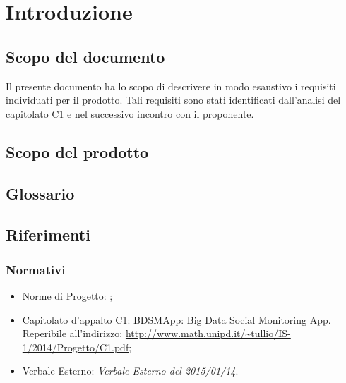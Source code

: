 %


\section{Introduzione}

\subsection{Scopo del documento}
Il presente documento ha lo scopo di descrivere in modo esaustivo i requisiti individuati per il prodotto. Tali requisiti sono stati identificati dall'analisi del capitolato C1 e nel successivo incontro con il proponente.

\subsection{Scopo del prodotto}
	\productScope

\subsection{Glossario}
	\glossarioDesc

\subsection{Riferimenti}
	\subsubsection{Normativi}
		\begin{itemize}
			\item Norme di Progetto: \docNameVersionNdP;
			\item Capitolato d’appalto C1: BDSMApp: Big Data Social Monitoring App. Reperibile all’indirizzo: \url{http://www.math.unipd.it/~tullio/IS-1/2014/Progetto/C1.pdf};
			\item Verbale Esterno: \emph{Verbale Esterno del 2015/01/14}.
		\end{itemize}

